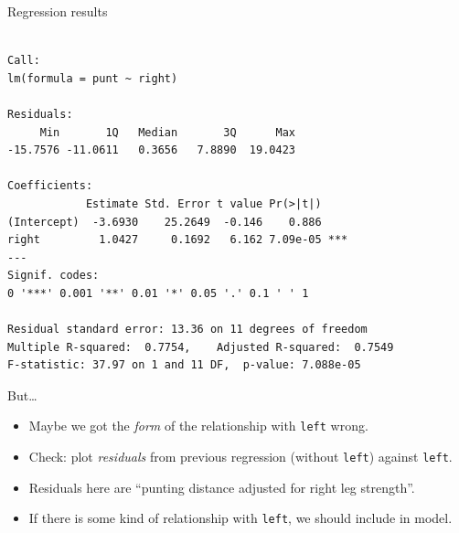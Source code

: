 \begin{frame}[fragile]{Regression results}

{\footnotesize
 
\begin{knitrout}
\color{fgcolor}\begin{kframe}
\begin{alltt}
\end{alltt}
\begin{verbatim}

Call:
lm(formula = punt ~ right)

Residuals:
     Min       1Q   Median       3Q      Max 
-15.7576 -11.0611   0.3656   7.8890  19.0423 

Coefficients:
            Estimate Std. Error t value Pr(>|t|)    
(Intercept)  -3.6930    25.2649  -0.146    0.886    
right         1.0427     0.1692   6.162 7.09e-05 ***
---
Signif. codes:  
0 '***' 0.001 '**' 0.01 '*' 0.05 '.' 0.1 ' ' 1

Residual standard error: 13.36 on 11 degrees of freedom
Multiple R-squared:  0.7754,	Adjusted R-squared:  0.7549 
F-statistic: 37.97 on 1 and 11 DF,  p-value: 7.088e-05
\end{verbatim}
\end{kframe}
\end{knitrout}
}
 
\end{frame}


\begin{frame}[fragile]{But\ldots}
  
  \begin{itemize}
  \item Maybe we got the \emph{form} of the relationship with
    \texttt{left} wrong.
  \item Check: plot \emph{residuals} from previous regression (without
    \texttt{left}) against \texttt{left}.
  \item Residuals here are ``punting distance adjusted for right
    leg strength''.
  \item If there is some kind of relationship with \texttt{left}, we
    should include in model.
  \end{itemize}
  
\end{frame}

